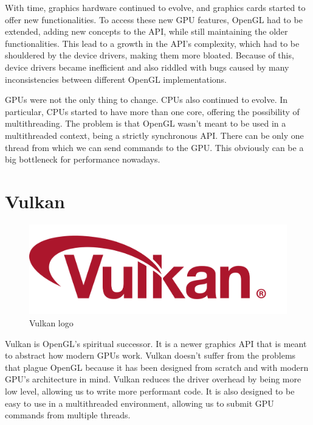 With time, graphics hardware continued to evolve, and graphics cards started
to offer new functionalities.
To access these new GPU features, OpenGL had to be extended, adding new
concepts to the API, while still maintaining the older functionalities.
This lead to a growth in the API's complexity, which had to be shouldered by
the device drivers, making them more bloated.
Because of this, device drivers became inefficient and also riddled with bugs
caused by many inconsistencies between different OpenGL implementations.

GPUs were not the only thing to change.
CPUs also continued to evolve.
In particular, CPUs started to have more than one core, offering the possibility
of multithreading.
The problem is that OpenGL wasn't meant to be used in a multithreaded context,
being a strictly synchronous API.
There can be only one thread from which we can send commands to the GPU.
This obviously can be a big bottleneck for performance nowadays.

\section{Vulkan}

\begin{figure}[H]
    \centering
    \includegraphics[scale=0.10]{images/ChVulkan/VulkanLogo.png}
    \caption{Vulkan logo}
    \label{fig::VulkanLogo}
\end{figure}

Vulkan is OpenGL's spiritual successor.
It is a newer graphics API that is meant to abstract how modern GPUs work.
Vulkan doesn't suffer from the problems that plague OpenGL because it has been
designed from scratch and with modern GPU's architecture in mind.
Vulkan reduces the driver overhead by being more low level, allowing us to
write more performant code.
It is also designed to be easy to use in a multithreaded environment,
allowing us to submit GPU commands from multiple threads.
